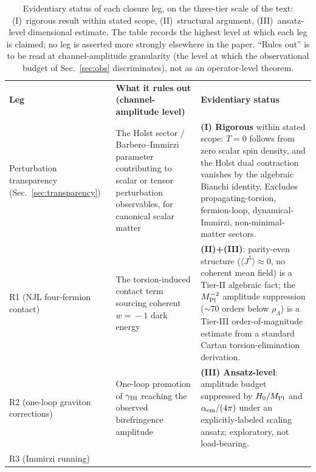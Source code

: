 \documentclass[aps,prd,twocolumn,superscriptaddress,showpacs,preprintnumbers,nofootinbib,longbibliography,floatfix]{revtex4-2}
\begin{document}
\begin{table}[tb]
\caption{\label{tab:evidentiary_status} Evidentiary status of each closure
leg, on the three-tier scale of the text: (I)~rigorous result within
stated scope, (II)~structural argument, (III)~ansatz-level dimensional
estimate. The table records the highest level at which each leg is
claimed; no leg is asserted more strongly elsewhere in the paper. ``Rules
out'' is to be read at channel-amplitude granularity (the level at which
the observational budget of Sec.~\ref{sec:obs} discriminates), not as an
operator-level theorem.}
\begin{ruledtabular}
\begin{tabular}{lll}
\textbf{Leg} & \textbf{What it rules out (channel-amplitude level)} &
\textbf{Evidentiary status} \\
\colrule
\parbox[t]{0.18\textwidth}{\raggedright Perturbation transparency
(Sec.~\ref{sec:transparency})\strut} &
\parbox[t]{0.40\textwidth}{\raggedright The Holst sector / Barbero--Immirzi
parameter contributing to scalar or tensor perturbation observables, for
canonical scalar matter\strut} &
\parbox[t]{0.32\textwidth}{\raggedright \textbf{(I) Rigorous} within stated
scope: $T=0$ follows from zero scalar spin density, and the Holst dual
contraction vanishes by the algebraic Bianchi identity. Excludes
propagating-torsion, fermion-loop, dynamical-Immirzi, non-minimal-matter
sectors.\strut} \\[3pt]
\parbox[t]{0.18\textwidth}{\raggedright R1 (NJL four-fermion contact)\strut} &
\parbox[t]{0.40\textwidth}{\raggedright The torsion-induced contact term
sourcing coherent $w\!=\!-1$ dark energy\strut} &
\parbox[t]{0.32\textwidth}{\raggedright \textbf{(II)+(III)}: parity-even
structure ($\langle J^5\rangle\!\approx\!0$, no coherent mean field) is a
Tier-II algebraic fact; the $M_{\rm Pl}^{-2}$ amplitude suppression
(${\sim}70$ orders below $\rho_\Lambda$) is a Tier-III order-of-magnitude
estimate from a standard Cartan torsion-elimination derivation.\strut} \\[3pt]
\parbox[t]{0.18\textwidth}{\raggedright R2 (one-loop graviton
corrections)\strut} &
\parbox[t]{0.40\textwidth}{\raggedright One-loop promotion of
$\gamma_{\rm BI}$ reaching the observed birefringence amplitude\strut} &
\parbox[t]{0.32\textwidth}{\raggedright \textbf{(III) Ansatz-level}: amplitude
budget suppressed by $H_0/M_{\rm Pl}$ and $\alpha_{\rm em}/(4\pi)$ under an
explicitly-labeled scaling ansatz; exploratory, not load-bearing.\strut}
\\[3pt]
\parbox[t]{0.18\textwidth}{\raggedright R3 (Immirzi running)\strut} &

\end{tabular}
\end{ruledtabular}
\end{table}
\end{document}

